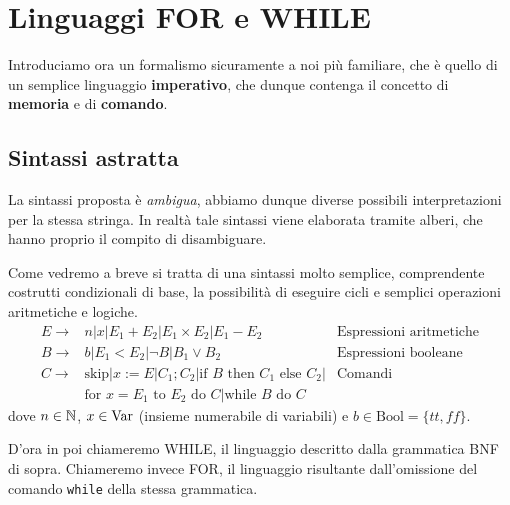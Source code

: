 \section{Linguaggi FOR e WHILE}
Introduciamo ora un formalismo sicuramente a noi più
familiare, che è quello di un semplice linguaggio
\textbf{imperativo}, che dunque contenga il concetto di
\textbf{memoria} e di \textbf{comando}.

\subsection{Sintassi astratta}
La sintassi proposta è \emph{ambigua}, abbiamo dunque diverse
possibili interpretazioni per la stessa stringa. In realtà
tale sintassi viene elaborata tramite alberi, che hanno proprio
il compito di disambiguare.

Come vedremo a breve si tratta di una sintassi molto semplice,
comprendente costrutti condizionali di base, la possibilità
di eseguire cicli e semplici operazioni aritmetiche e logiche.
\begin{align*}
	E \to                                 &
	n | x | E_1 + E_2 | E_1 \times E_2 \vert E_1 - E_2
	                                      &
	\text{Espressioni aritmetiche}          \\
	B \to                                 &
	b | E_1 < E_2 | \lnot B | B_1 \lor B_2
	                                      &
	\text{Espressioni booleane}             \\
	C\to                                  &
	\text{skip} | x := E | C_1 ; C_2 | \text{if } B
	\text{ then } C_1 \text{ else } C_2 | &
	\text{Comandi}                          \\
	                                      &
	\text{for } x = E_1 \text{ to } E_2 \text{ do } C |
	\text{while } B \text{ do } C
\end{align*}
dove $n \in \mathbb{N}$, $x \in \operatorname{Var}$ (insieme numerabile di
variabili) e $b \in \text{Bool} = \{ tt, ff \}$.

D'ora in poi chiameremo WHILE, il linguaggio descritto dalla
grammatica BNF di sopra. Chiameremo invece FOR, il linguaggio
risultante dall'omissione del comando \verb|while| della
stessa grammatica.

